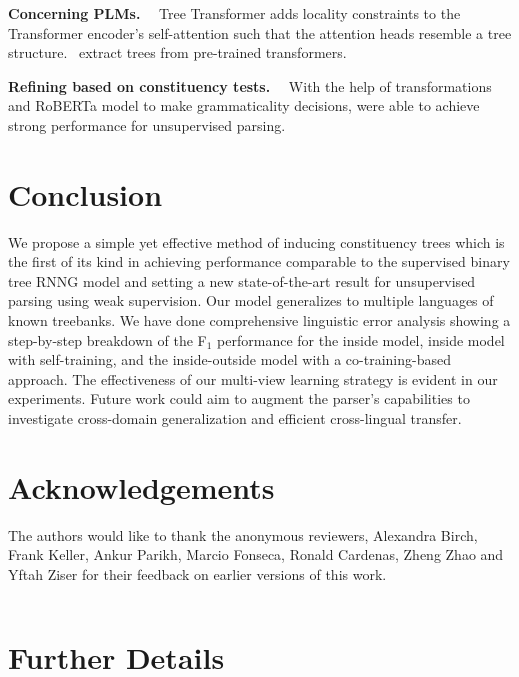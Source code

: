 \documentclass[11pt]{article}
\newcommand{\para}[1]{\vskip 1mm\noindent\textbf{#1}~~}
\begin{document}
\para{Concerning PLMs.} Tree Transformer \citep{wang-etal-2019-tree} adds locality constraints to the Transformer encoder's self-attention such that the attention heads resemble a tree structure.~\citet{Kim2020Are} extract trees from pre-trained transformers. 



\para{Refining based on constituency tests.} With the help of transformations and RoBERTa model to make grammaticality decisions, \citep{cao-etal-2020-unsupervised} were able to achieve strong performance for unsupervised parsing. 
 \section{Conclusion}
\label{sec:conclusion}
We propose a simple yet effective method of inducing constituency trees which is the first of its kind in achieving performance comparable to the supervised binary tree RNNG model and setting a new state-of-the-art result for unsupervised parsing using weak supervision. Our model generalizes to multiple languages of known treebanks. We have done comprehensive linguistic error analysis showing a step-by-step breakdown of the F$_1$ performance for the inside model, inside model with self-training, and the inside-outside model with a co-training-based approach. The effectiveness of our multi-view learning strategy is evident in our experiments. Future work could aim to augment the parser's capabilities to investigate cross-domain generalization and efficient cross-lingual transfer.



\section*{Acknowledgements}

The authors would like to thank the anonymous reviewers, Alexandra Birch, Frank Keller, Ankur Parikh, Marcio Fonseca, Ronald Cardenas, Zheng Zhao and Yftah Ziser for their feedback on earlier versions of this work.
 



\appendix
\newpage

$\,$

\newpage

\section{Further Details}
\label{sec:appendix}
\end{document}
